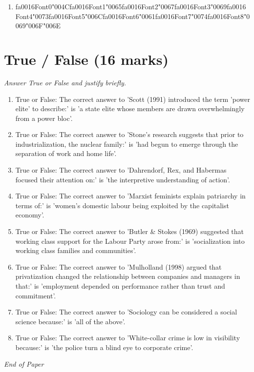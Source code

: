 \documentclass[12pt]{article}
\begin{document}
\begin{enumerate}[label=\arabic*.]
\begin{enumerate}[label=(\alph*)]
    \item {\csname fa0016Font0\endcsname\char"004C}{\csname fa0016Font1\endcsname\char"0065}{\csname fa0016Font2\endcsname\char"0067}{\csname fa0016Font3\endcsname\char"0069}{\csname fa0016Font4\endcsname\char"0073}{\csname fa0016Font5\endcsname\char"006C}{\csname fa0016Font6\endcsname\char"0061}{\csname fa0016Font7\endcsname\char"0074}{\csname fa0016Font8\endcsname\char"0069}{\char"006F}{\char"006E}
\end{enumerate}
\end{enumerate}

\section*{True / False (16 marks)}
\textit{Answer True or False and justify briefly.}
\begin{enumerate}[label=\arabic*.]
\item True or False: The correct answer to 'Scott (1991) introduced the term 'power elite' to describe:' is 'a state elite whose members are drawn overwhelmingly from a power bloc'.
\item True or False: The correct answer to 'Stone's research suggests that prior to industrialization, the nuclear family:' is 'had begun to emerge through the separation of work and home life'.
\item True or False: The correct answer to 'Dahrendorf, Rex, and Habermas focused their attention on:' is 'the interpretive understanding of action'.
\item True or False: The correct answer to 'Marxist feminists explain patriarchy in terms of:' is 'women's domestic labour being exploited by the capitalist economy'.
\item True or False: The correct answer to 'Butler \& Stokes (1969) suggested that working class support for the Labour Party arose from:' is 'socialization into working class families and communities'.
\item True or False: The correct answer to 'Mulholland (1998) argued that privatization changed the relationship between companies and managers in that:' is 'employment depended on performance rather than trust and commitment'.
\item True or False: The correct answer to 'Sociology can be considered a social science because:' is 'all of the above'.
\item True or False: The correct answer to 'White-collar crime is low in visibility because:' is 'the police turn a blind eye to corporate crime'.
\end{enumerate}

\vfill
\noindent\textit{End of Paper}
\end{document}
